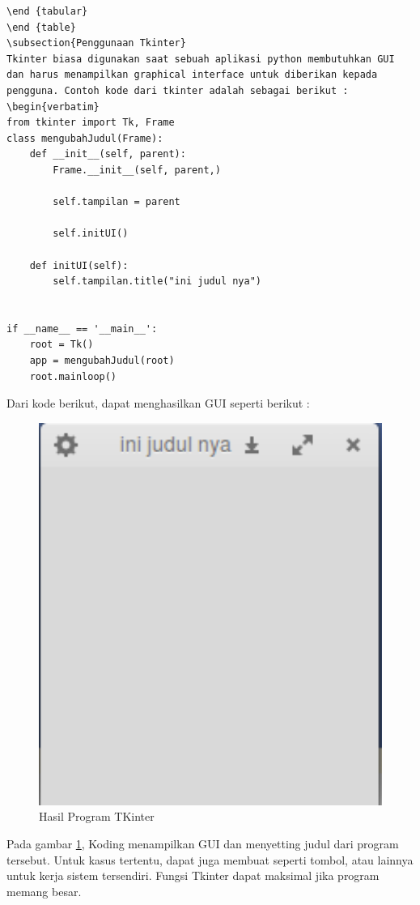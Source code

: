 \begin {verbatim}
\end {tabular}
\end {table}
\subsection{Penggunaan Tkinter}
Tkinter biasa digunakan saat sebuah aplikasi python membutuhkan GUI dan harus menampilkan graphical interface untuk diberikan kepada pengguna. Contoh kode dari tkinter adalah sebagai berikut : 
\begin{verbatim}
from tkinter import Tk, Frame
class mengubahJudul(Frame):
    def __init__(self, parent):
        Frame.__init__(self, parent,)

        self.tampilan = parent

        self.initUI()

    def initUI(self):
        self.tampilan.title("ini judul nya")


if __name__ == '__main__':
    root = Tk()
    app = mengubahJudul(root)
    root.mainloop()
\end{verbatim}
Dari kode berikut, dapat menghasilkan GUI seperti berikut : 
	\begin{figure} [ht]
		\centerline{\includegraphics[width=1\textwidth]{figures/tkinterguiexample.png}}
		\caption{Hasil Program TKinter}
		\label{resultkinter}
	\end{figure}
Pada gambar \ref{resultkinter}, Koding menampilkan GUI dan menyetting judul dari program tersebut. Untuk kasus tertentu, dapat juga membuat seperti tombol, atau lainnya untuk kerja sistem tersendiri. Fungsi Tkinter dapat maksimal jika program memang besar.